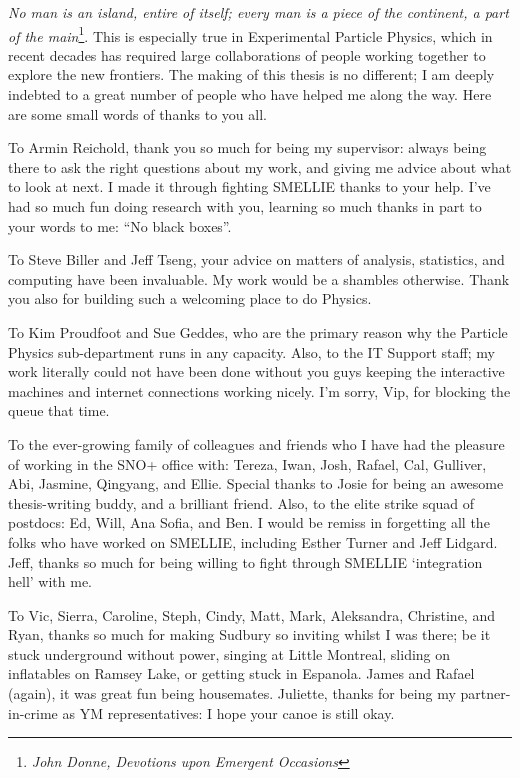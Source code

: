 
\begin{acknowledgements}      

\textit{No man is an island, entire of itself; every man is a piece of the continent, a part of the main}\footnote{\textit{John Donne, Devotions upon Emergent Occasions}}. 
This is especially true in Experimental Particle Physics, which in recent decades has required large collaborations of people working together to explore the new frontiers. The making of this thesis is no different; I am deeply indebted to a great number of people who have helped me along the way. Here are some small words of thanks to you all.

To Armin Reichold, thank you so much for being my supervisor: always being there to ask the right questions about my work, and giving me advice about what to look at next. I made it through fighting SMELLIE thanks to your help. I've had so much fun doing research with you, learning so much thanks in part to your words to me: ``No black boxes''.

To Steve Biller and Jeff Tseng, your advice on matters of analysis, statistics, and computing have been invaluable. My work would be a shambles otherwise. Thank you also for building such a welcoming place to do Physics.

To Kim Proudfoot and Sue Geddes, who are the primary reason why the Particle Physics sub-department runs in any capacity. Also, to the IT Support staff; my work literally could not have been done without you guys keeping the interactive machines and internet connections working nicely. I'm sorry, Vip, for blocking the queue that time.

To the ever-growing family of colleagues and friends who I have had the pleasure of working in the SNO+ office with: Tereza, Iwan, Josh, Rafael, Cal, Gulliver, Abi, Jasmine, Qingyang, and Ellie. Special thanks to Josie for being an awesome thesis-writing buddy, and a brilliant friend. Also, to the elite strike squad of postdocs: Ed, Will, Ana Sofia, and Ben. I would be remiss in forgetting all the folks who have worked on SMELLIE, including Esther Turner and Jeff Lidgard. Jeff, thanks so much for being willing to fight through SMELLIE `integration hell' with me.

To Vic, Sierra, Caroline, Steph, Cindy, Matt, Mark, Aleksandra, Christine, and Ryan, thanks so much for making Sudbury so inviting whilst I was there; be it stuck underground without power, singing at Little Montreal, sliding on inflatables on Ramsey Lake, or getting stuck in Espanola. James and Rafael (again), it was great fun being housemates. Juliette, thanks for being my partner-in-crime as YM representatives: I hope your canoe is still okay.


\end{acknowledgements}
